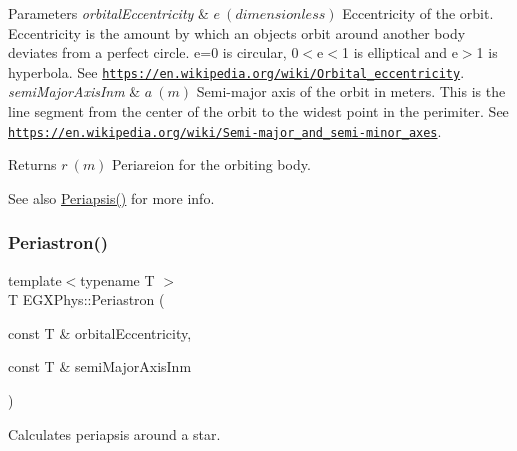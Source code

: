 \begin{DoxyParams}{Parameters}
{\em orbital\+Eccentricity} & $ e\ (dimensionless)$ Eccentricity of the orbit. Eccentricity is the amount by which an objects orbit around another body deviates from a perfect circle. e=0 is circular, 0$<$e$<$1 is elliptical and e$>$1 is hyperbola. See \href{https://en.wikipedia.org/wiki/Orbital_eccentricity}{\tt https\+://en.\+wikipedia.\+org/wiki/\+Orbital\+\_\+eccentricity}. \\
\hline
{\em semi\+Major\+Axis\+Inm} & $ a\ (m)$ Semi-\/major axis of the orbit in meters. This is the line segment from the center of the orbit to the widest point in the perimiter. See \href{https://en.wikipedia.org/wiki/Semi-major_and_semi-minor_axes}{\tt https\+://en.\+wikipedia.\+org/wiki/\+Semi-\/major\+\_\+and\+\_\+semi-\/minor\+\_\+axes}. \\
\hline
\end{DoxyParams}
\begin{DoxyReturn}{Returns}
$ r\ (m)$ Periareion for the orbiting body. 
\end{DoxyReturn}
\begin{DoxySeeAlso}{See also}
\mbox{\hyperlink{group___e_g_x_phys-_periapsis_gad487212733711bc2ce73c8137c9309c3}{Periapsis()}} for more info. 
\end{DoxySeeAlso}
\mbox{\label{group___e_g_x_phys-_periapsis_gaf3c623561998f107496fb7341698ae9d}} 
\subsubsection{\texorpdfstring{Periastron()}{Periastron()}}
{\footnotesize\ttfamily template$<$typename T $>$ \\
T E\+G\+X\+Phys\+::\+Periastron (\begin{DoxyParamCaption}\item[{const T \&}]{orbital\+Eccentricity,  }\item[{const T \&}]{semi\+Major\+Axis\+Inm }\end{DoxyParamCaption})}



Calculates periapsis around a star. 


